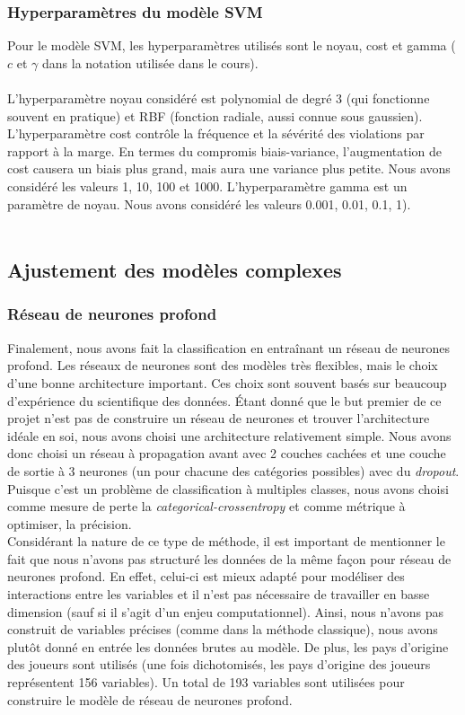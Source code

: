\subsubsection{Hyperparamètres du modèle SVM}
Pour le modèle SVM, les hyperparamètres utilisés sont le noyau, cost et gamma ($c$ et $\gamma$ dans la notation utilisée dans le cours).\\ \\ 
L'hyperparamètre noyau considéré est polynomial de degré 3 (qui fonctionne souvent en pratique) et RBF (fonction radiale, aussi connue sous gaussien). L'hyperparamètre cost contrôle la fréquence et la sévérité des violations par rapport à la marge. En termes du compromis biais-variance, l'augmentation de cost causera un biais plus grand, mais aura une variance plus petite. Nous avons considéré les valeurs 1, 10, 100 et 1000. L'hyperparamètre gamma est un paramètre de noyau. Nous avons considéré les valeurs 0.001, 0.01, 0.1, 1).\\ \\ 

\subsection{Ajustement des modèles complexes}

\subsubsection{Réseau de neurones profond}

Finalement, nous avons fait la classification en entraînant un réseau de neurones profond. Les réseaux de neurones sont des modèles très flexibles, mais le choix d'une bonne architecture important. Ces choix sont souvent basés sur beaucoup d'expérience du scientifique des données. Étant donné que le but premier de ce projet n'est pas de construire un réseau de neurones et trouver l'architecture idéale en soi, nous avons choisi une architecture relativement simple. Nous avons donc choisi un réseau à propagation avant avec 2 couches cachées et une couche de sortie à 3 neurones (un pour chacune des catégories possibles) avec du \textit{dropout}. Puisque c'est un problème de classification à multiples classes, nous avons choisi comme mesure de perte la \textit{categorical-crossentropy} et comme métrique à optimiser, la précision.\\

Considérant la nature de ce type de méthode, il est important de mentionner le fait que nous n'avons pas structuré les données de la même façon pour réseau de neurones profond. En effet, celui-ci est mieux adapté pour modéliser des interactions entre les variables et il n'est pas nécessaire de travailler en basse dimension (sauf si il s'agit d'un enjeu computationnel). Ainsi, nous n'avons pas construit de variables précises (comme dans la méthode classique), nous avons plutôt donné en entrée les données brutes au modèle. De plus, les pays d'origine des joueurs sont utilisés (une fois dichotomisés, les pays d'origine des joueurs représentent 156 variables). Un total de 193 variables sont utilisées pour construire le modèle de réseau de neurones profond.

